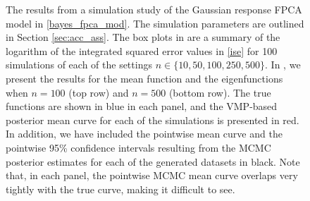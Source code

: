 \documentclass[12pt]{article}
\theoremstyle{plain}
\theoremstyle{definition}
\theoremstyle{remark}
\begin{document}
\begin{figure}[t!]
\centering
\tabskip=0pt
\caption{
	The results from a simulation study of the Gaussian response FPCA model in \eqref{bayes_fpca_mod}. The
	simulation parameters are outlined in Section \ref{sec:acc_ass}.
	The box plots in  are a summary of the logarithm of the
	integrated squared error values in \eqref{ise}
	for 100 simulations of each of the settings $n \in \{ 10, 50, 100, 250, 500 \}$.
	In , we present the results for the mean function and the eigenfunctions when
	$n = 100$ (top row) and $n = 500$ (bottom row). The true functions are shown in blue in each panel,
	and the VMP-based posterior mean curve for each of the simulations is presented in red. In addition, we have
	included the pointwise mean curve and the pointwise 95\% confidence intervals resulting from the MCMC
	posterior estimates for each of the generated datasets in black. Note that, in each panel,
	the pointwise MCMC mean curve overlaps very tightly with the true curve,
	making it difficult to see.
}
\label{fig:gauss_resp_sim_st}
\end{figure}
\end{document}
